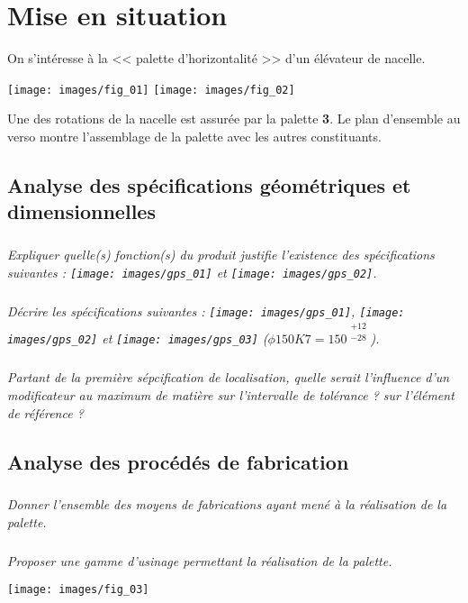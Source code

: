\documentclass[10pt,fleqn]{article} %
\begin{document}

\vspace{4cm}
\pagestyle{fancy}
\thispagestyle{plain}


\def\columnseprulecolor{\color{ocre}}
\setlength{\columnseprule}{0.4pt} 

\section*{Mise en situation}
\ifprof
\else
\fi

On s'intéresse à la << palette d'horizontalité >> d'un élévateur de nacelle. 

\begin{center}
\texttt{[image: images/fig\_01]}
\texttt{[image: images/fig\_02]}
\end{center}

Une des rotations de la nacelle est assurée par la palette \textbf{3}.
Le plan d'ensemble au verso montre l'assemblage de la palette avec les autres constituants. 

\subsection*{Analyse des spécifications géométriques et dimensionnelles}
\subparagraph{}
\textit{Expliquer quelle(s) fonction(s) du produit justifie l'existence des spécifications suivantes :
\texttt{[image: images/gps\_01]} et \texttt{[image: images/gps\_02]}.}


\subparagraph{}
\textit{Décrire les spécifications suivantes :
\texttt{[image: images/gps\_01]}, \texttt{[image: images/gps\_02]} et  \texttt{[image: images/gps\_03]} ($\phi 150 K7 = 150^{\begin{array}{c} +12 \\ -28 \end{array}}$).}

\subparagraph{}
\textit{Partant de la première sépcification de localisation, quelle serait l'influence d'un modificateur au maximum de matière sur l'intervalle de tolérance  ? sur l'élément de référence ? }


\subsection*{Analyse des procédés de fabrication}
\subparagraph{}
\textit{Donner l'ensemble des moyens de fabrications ayant mené à la réalisation de la palette.}

\subparagraph{}
\textit{Proposer une gamme d'usinage permettant la réalisation de la palette.}





\begin{center}

{\texttt{[image: images/fig\_03]}}
\end{center}
\end{document}
